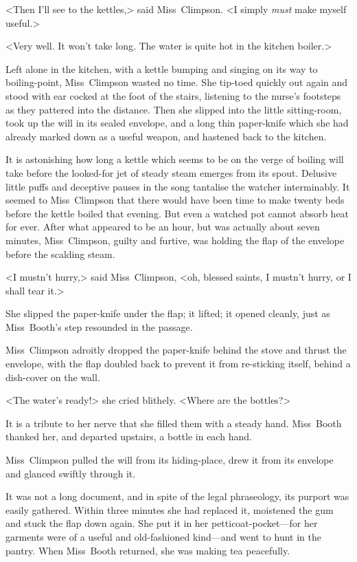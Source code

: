 <Then I'll see to the kettles,> said Miss~Climpson. <I simply \emph{must} make myself useful.>

<Very well. It won't take long. The water is quite hot in the kitchen boiler.>

Left alone in the kitchen, with a kettle bumping and singing on its way to boiling-point, Miss~Climpson wasted no time. She tip-toed quickly out again and stood with ear cocked at the foot of the stairs, listening to the nurse's footsteps as they pattered into the distance. Then she slipped into the little sitting-room, took up the will in its sealed envelope, and a long thin paper-knife which she had already marked down as a useful weapon, and hastened back to the kitchen.

It is astonishing how long a kettle which seems to be on the verge of boiling will take before the looked-for jet of steady steam emerges from its spout. Delusive little puffs and deceptive pauses in the song tantalise the watcher interminably. It seemed to Miss~Climpson that there would have been time to make twenty beds before the kettle boiled that evening. But even a watched pot cannot absorb heat for ever. After what appeared to be an hour, but was actually about seven minutes, Miss~Climpson, guilty and furtive, was holding the flap of the envelope before the scalding steam.

<I mustn't hurry,> said Miss~Climpson, <oh, blessed saints, I mustn't hurry, or I shall tear it.>

She slipped the paper-knife under the flap; it lifted; it opened cleanly, just as Miss~Booth's step resounded in the passage.

Miss~Climpson adroitly dropped the paper-knife behind the stove and thrust the envelope, with the flap doubled back to prevent it from re-sticking itself, behind a dish-cover on the wall.

<The water's ready!> she cried blithely. <Where are the bottles?>

It is a tribute to her nerve that she filled them with a steady hand. Miss~Booth thanked her, and departed upstairs, a bottle in each hand.

Miss~Climpson pulled the will from its hiding-place, drew it from its envelope and glanced swiftly through it.

It was not a long document, and in spite of the legal phraseology, its purport was easily gathered. Within three minutes she had replaced it, moistened the gum and stuck the flap down again. She put it in her petticoat-pocket—for her garments were of a useful and old-fashioned kind—and went to hunt in the pantry. When Miss~Booth returned, she was making tea peacefully.

